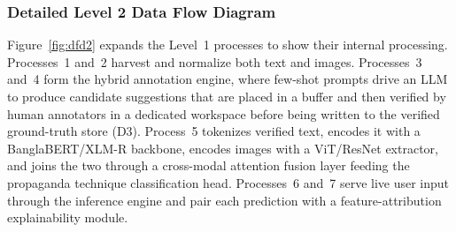 \subsubsection{Detailed Level 2 Data Flow Diagram}
\label{sec:dfd2}
Figure~\ref{fig:dfd2} expands the Level~1 processes to show their internal
processing. Processes~1 and~2 harvest and normalize both text and images.
Processes~3 and~4 form the hybrid annotation engine, where few-shot prompts drive an
LLM to produce candidate suggestions that are placed in a buffer and then verified
by human annotators in a dedicated workspace before being written to the verified
ground-truth store (D3). Process~5 tokenizes verified text, encodes it with a
BanglaBERT/XLM-R backbone, encodes images with a ViT/ResNet extractor, and joins the
two through a cross-modal attention fusion layer feeding the propaganda technique
classification head. Processes~6 and~7 serve live user input through the inference
engine and pair each prediction with a feature-attribution explainability module.

